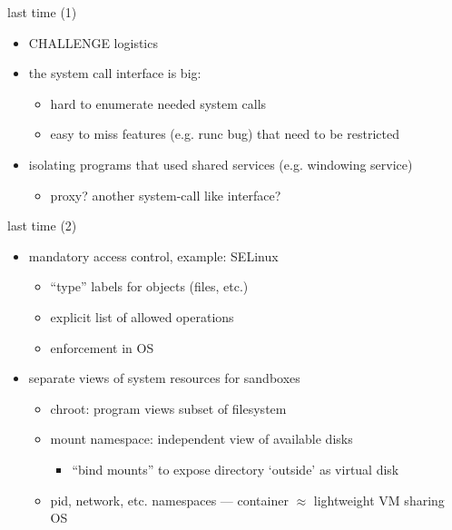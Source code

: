 \graphicspath{{./figures/}}
\title{}
\date{}
\usepackage{pgfpages}

\begin{frame}
    \titlepage
\end{frame}

\begin{frame}{last time (1)}
    \begin{itemize}
    \item CHALLENGE logistics
    \item the system call interface is big:
        \begin{itemize}
        \item hard to enumerate needed system calls
        \item easy to miss features (e.g. runc bug) that need to be restricted
        \end{itemize}
    \item isolating programs that used shared services (e.g. windowing service)
        \begin{itemize}
        \item proxy? another system-call like interface?
        \end{itemize}
    \end{itemize}
\end{frame}

\begin{frame}{last time (2)}
    \begin{itemize}
    \item mandatory access control, example: SELinux
        \begin{itemize}
        \item ``type'' labels for objects (files, etc.)
        \item explicit list of allowed operations
        \item enforcement in OS
        \end{itemize}
    \item separate views of system resources for sandboxes
        \begin{itemize}
        \item chroot: program views subset of filesystem
        \item mount namespace: independent view of available disks
            \begin{itemize}
            \item ``bind mounts'' to expose directory `outside' as virtual disk
            \end{itemize}
        \item pid, network, etc. namespaces --- container $\approx$ lightweight VM sharing OS
        \end{itemize}
    \end{itemize}
\end{frame}

